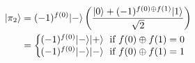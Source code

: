 \documentclass[preview]{standalone}
\begin{document}
\begin{align*}
|\pi_2\rangle &= (-1)^{f(0)}|-\rangle \left( \frac{|0\rangle + (-1)^{f(0)\oplus f(1)} |1\rangle}{\sqrt{2}}\right) \\ &=  \left\{ \begin{array}{ll} \hspace{-2mm} (-1)^{f(0)} |-\rangle |+\rangle \; \text{ if } f(0) \oplus f(1) = 0 \\ \hspace{-2mm} (-1)^{f(0)} |-\rangle|-\rangle \; \text{ if } f(0) \oplus f(1) = 1 \end{array} \right.
\end{align*}
\end{document}
